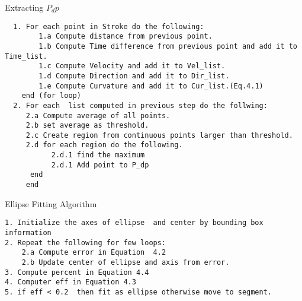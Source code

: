 \begin{algorithm}
\caption{Extracting $P_dp$}
\label{extractpdp}
\begin{verbatim}
  1. For each point in Stroke do the following:
  		1.a Compute distance from previous point.
  		1.b Compute Time difference from previous point and add it to Time_list.  
  		1.c Compute Velocity and add it to Vel_list. 
  		1.d Compute Direction and add it to Dir_list.
  	 	1.e Compute Curvature and add it to Cur_list.(Eq.4.1) 
  	end (for loop)
  2. For each  list computed in previous step do the follwing:   
  	 2.a Compute average of all points. 
  	 2.b set average as threshold.  
  	 2.c Create region from continuous points larger than threshold. 
  	 2.d for each region do the following. 
  	 	   2.d.1 find the maximum 
  	 	   2.d.1 Add point to P_dp 
  	  end
     end 
\end{verbatim}	
\end{algorithm}
\begin{algorithm}
\caption{Ellipse Fitting Algorithm}
\label{ellipseFitAlg}
\begin{verbatim}
1. Initialize the axes of ellipse  and center by bounding box information
2. Repeat the following for few loops: 
	2.a Compute error in Equation  4.2 
	2.b Update center of ellipse and axis from error. 
3. Compute percent in Equation 4.4 
4. Computer eff in Equation 4.3 
5. if eff < 0.2  then fit as ellipse otherwise move to segment. 
\end{verbatim}	
\end{algorithm}
 
